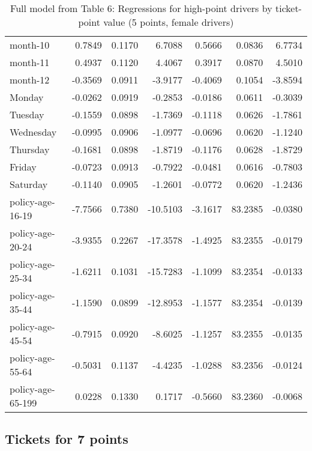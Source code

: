 \documentclass[10pt]{article}
\begin{document}
\begin{table}[ht]
\begin{tabular}{lrrrrrr}
  month-10 & 0.7849 & 0.1170 & 6.7088 & 0.5666 & 0.0836 & 6.7734 \\ 
  month-11 & 0.4937 & 0.1120 & 4.4067 & 0.3917 & 0.0870 & 4.5010 \\ 
  month-12 & -0.3569 & 0.0911 & -3.9177 & -0.4069 & 0.1054 & -3.8594 \\ 
  Monday & -0.0262 & 0.0919 & -0.2853 & -0.0186 & 0.0611 & -0.3039 \\ 
  Tuesday & -0.1559 & 0.0898 & -1.7369 & -0.1118 & 0.0626 & -1.7861 \\ 
  Wednesday & -0.0995 & 0.0906 & -1.0977 & -0.0696 & 0.0620 & -1.1240 \\ 
  Thursday & -0.1681 & 0.0898 & -1.8719 & -0.1176 & 0.0628 & -1.8729 \\ 
  Friday & -0.0723 & 0.0913 & -0.7922 & -0.0481 & 0.0616 & -0.7803 \\ 
  Saturday & -0.1140 & 0.0905 & -1.2601 & -0.0772 & 0.0620 & -1.2436 \\ 
  policy-age-16-19 & -7.7566 & 0.7380 & -10.5103 & -3.1617 & 83.2385 & -0.0380 \\ 
  policy-age-20-24 & -3.9355 & 0.2267 & -17.3578 & -1.4925 & 83.2355 & -0.0179 \\ 
  policy-age-25-34 & -1.6211 & 0.1031 & -15.7283 & -1.1099 & 83.2354 & -0.0133 \\ 
  policy-age-35-44 & -1.1590 & 0.0899 & -12.8953 & -1.1577 & 83.2354 & -0.0139 \\ 
  policy-age-45-54 & -0.7915 & 0.0920 & -8.6025 & -1.1257 & 83.2355 & -0.0135 \\ 
  policy-age-55-64 & -0.5031 & 0.1137 & -4.4235 & -1.0288 & 83.2356 & -0.0124 \\ 
  policy-age-65-199 & 0.0228 & 0.1330 & 0.1717 & -0.5660 & 83.2360 & -0.0068 \\ 
   \hline
\end{tabular}
\caption{Full model from Table 6: Regressions for high-point drivers by ticket-point value (5 points, female drivers)} 
\label{tab_6_5_pts_F}
\end{table}


\clearpage
\pagebreak




\subsection{Tickets for 7 points}
\end{document}
